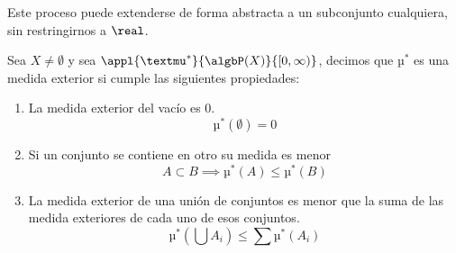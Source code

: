 \documentclass{apuntes}
\begin{document}
Este proceso puede extenderse de forma abstracta a un subconjunto cualquiera, sin restringirnos a $\real$.

\begin{defn}
Sea $X \neq \emptyset$ y sea $\appl{µ^*}{\algbP(X)}{[0, \infty)}$, decimos que $µ^*$ es una medida exterior si cumple las siguientes propiedades:
\begin{enumerate}
\item La medida exterior del vacío es 0.
\[µ^*(\emptyset) = 0\]
\item Si un conjunto se contiene en otro su medida es menor
\[A \subset B \implies µ^*(A) \leq µ^*(B)\]
\item La medida exterior de una unión de conjuntos es menor que la suma de las medida exteriores de cada uno de esos conjuntos.
\[µ^*(\bigcup A_i) \leq \sum µ^*(A_i)\]
\end{enumerate}
\end{defn}
\end{document}

